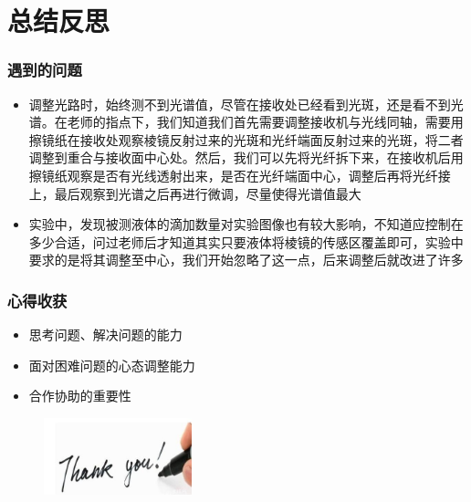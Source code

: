 \documentclass{beamer}
\begin{document}
\section{总结反思}

\begin{frame}
  \frametitle{遇到的问题}
  \begin{itemize}
    \item 调整光路时，始终测不到光谱值，尽管在接收处已经看到光斑，还是看不到光谱。在老师的指点下，我们知道我们首先需要调整接收机与光线同轴，需要用擦镜纸在接收处观察棱镜反射过来的光斑和光纤端面反射过来的光斑，将二者调整到重合与接收面中心处。然后，我们可以先将光纤拆下来，在接收机后用擦镜纸观察是否有光线透射出来，是否在光纤端面中心，调整后再将光纤接上，最后观察到光谱之后再进行微调，尽量使得光谱值最大
    \item 实验中，发现被测液体的滴加数量对实验图像也有较大影响，不知道应控制在多少合适，问过老师后才知道其实只要液体将棱镜的传感区覆盖即可，实验中要求的是将其调整至中心，我们开始忽略了这一点，后来调整后就改进了许多
  \end{itemize}
\end{frame}
\begin{frame}
  \frametitle{心得收获}
  \begin{itemize}
    \item 思考问题、解决问题的能力
    \item 面对困难问题的心态调整能力
    \item 合作协助的重要性
  \end{itemize}
\end{frame}


\begin{frame}
    \begin{figure}
      \includegraphics[height=2.23cm,width=4.29cm]{images/thank.jpg}
    \end{figure} 
\end{frame}
\end{document}

